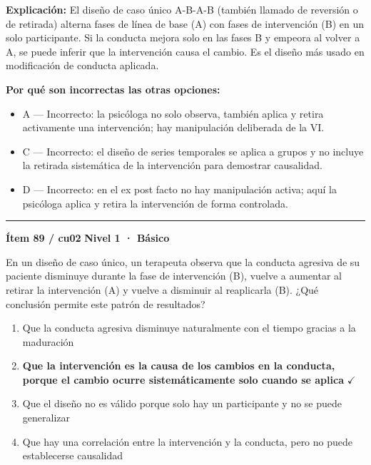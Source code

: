\documentclass[12pt,a4paper]{article}
\begin{document}
\noindent\textbf{\color{azul}Explicación:} El diseño de caso único A-B-A-B (también llamado de reversión o de retirada) alterna fases de línea de base (A) con fases de intervención (B) en un solo participante. Si la conducta mejora solo en las fases B y empeora al volver a A, se puede inferir que la intervención causa el cambio. Es el diseño más usado en modificación de conducta aplicada.

\noindent\textbf{\color{gris}Por qué son incorrectas las otras opciones:}
\begin{itemize}
  \item {\small A — Incorrecto: la psicóloga no solo observa, también aplica y retira activamente una intervención; hay manipulación deliberada de la VI.}
  \item {\small C — Incorrecto: el diseño de series temporales se aplica a grupos y no incluye la retirada sistemática de la intervención para demostrar causalidad.}
  \item {\small D — Incorrecto: en el ex post facto no hay manipulación activa; aquí la psicóloga aplica y retira la intervención de forma controlada.}
\end{itemize}
\vspace{8pt}\hrule\vspace{10pt}

\begin{mdframed}[backgroundcolor=fondogris,linecolor=azul,linewidth=1pt,innerleftmargin=10pt,innerrightmargin=10pt,innertopmargin=7pt,innerbottommargin=7pt]
\textbf{Ítem 89 / cu02} \hfill {\small\bfseries\color{azul} Nivel 1 · Básico}
\end{mdframed}

En un diseño de caso único, un terapeuta observa que la conducta agresiva de su paciente disminuye durante la fase de intervención (B), vuelve a aumentar al retirar la intervención (A) y vuelve a disminuir al reaplicarla (B). ¿Qué conclusión permite este patrón de resultados?

\begin{enumerate}
  \item[A.] Que la conducta agresiva disminuye naturalmente con el tiempo gracias a la maduración
  \item[\textbf{\color{verde}B.}] \textbf{\color{verde} Que la intervención es la causa de los cambios en la conducta, porque el cambio ocurre sistemáticamente solo cuando se aplica} \hfill $\checkmark$
  \item[C.] Que el diseño no es válido porque solo hay un participante y no se puede generalizar
  \item[D.] Que hay una correlación entre la intervención y la conducta, pero no puede establecerse causalidad
\end{enumerate}
\end{document}
